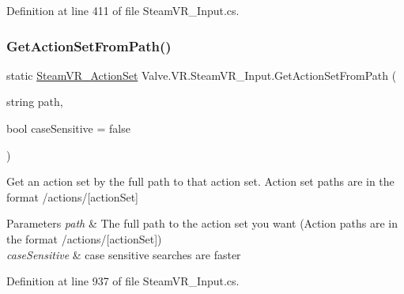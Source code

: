 Definition at line 411 of file Steam\+V\+R\+\_\+\+Input.\+cs.

\mbox{\label{class_valve_1_1_v_r_1_1_steam_v_r___input_ae8457bd35fd6eb86e62371d56af44254}} 
\subsubsection{\texorpdfstring{GetActionSetFromPath()}{GetActionSetFromPath()}}
{\footnotesize\ttfamily static \mbox{\hyperlink{class_valve_1_1_v_r_1_1_steam_v_r___action_set}{Steam\+V\+R\+\_\+\+Action\+Set}} Valve.\+V\+R.\+Steam\+V\+R\+\_\+\+Input.\+Get\+Action\+Set\+From\+Path (\begin{DoxyParamCaption}\item[{string}]{path,  }\item[{bool}]{case\+Sensitive = {\ttfamily false} }\end{DoxyParamCaption})\hspace{0.3cm}{\ttfamily [static]}}



Get an action set by the full path to that action set. Action set paths are in the format /actions/\mbox{[}action\+Set\mbox{]} 


\begin{DoxyParams}{Parameters}
{\em path} & The full path to the action set you want (Action paths are in the format /actions/\mbox{[}action\+Set\mbox{]})\\
\hline
{\em case\+Sensitive} & case sensitive searches are faster\\
\hline
\end{DoxyParams}


Definition at line 937 of file Steam\+V\+R\+\_\+\+Input.\+cs.

\mbox{\label{class_valve_1_1_v_r_1_1_steam_v_r___input_a159b8db4e142e2250aaa1b2e1d1e38b9}} 
